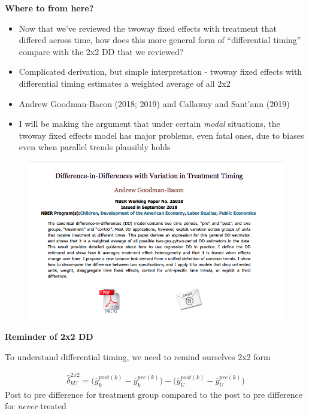\documentclass[notes=show]{beamer}
\begin{document}
\begin{frame}[plain]
\begin{center}
\textbf{Where to from here?}
\end{center}

\begin{itemize}
\item Now that we've reviewed the twoway fixed effects with treatment that differed across time, how does this more general form of ``differential timing'' compare with the 2x2 DD that we reviewed?
\item Complicated derivation, but simple interpretation - twoway fixed effects with differential timing estimates a weighted average of all 2x2
\item Andrew Goodman-Bacon (2018; 2019) and Callaway and Sant'ann (2019)
\item I will be making the argument that under certain \emph{modal} situations, the twoway fixed effects model has major problems, even fatal ones, due to biases even when parallel trends plausibly holds
\end{itemize}

\end{frame}

\begin{frame}[plain]
\begin{figure}
\includegraphics[scale=0.45]{./lecture_includes/nber_bacon_goodman.png}
\end{figure}

\end{frame}


\begin{frame}[plain]
\begin{center}
\textbf{Reminder of 2x2 DD}
\end{center}

To understand differential timing, we need to remind ourselves 2x2 form

\begin{eqnarray*}
\widehat{\delta}^{2x2}_{kU} = \bigg ( \overline{y}_k^{post(k)} - \overline{y}_k^{pre(k)} \bigg ) - \bigg ( \overline{y}_U^{post(k)} - \overline{y}_U^{pre(k)} \bigg )
\end{eqnarray*}
Post to pre difference for treatment group compared to the post to pre difference for \emph{never} treated


\end{frame}
\end{document}
